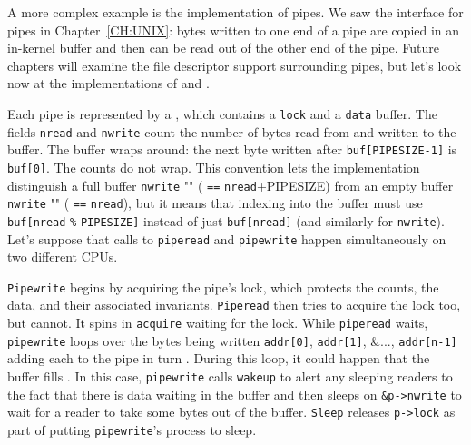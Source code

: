 A more complex example is the implementation of pipes.
We saw the interface for pipes in Chapter~\ref{CH:UNIX}:
bytes written to one end of a pipe are copied
in an in-kernel buffer and then can be read out
of the other end of the pipe.
Future chapters will examine the file descriptor support
surrounding pipes, but let's look now at the
implementations of 
and
.

Each pipe
is represented by a 
,
which contains
a 
\lstinline{lock}
and a 
\lstinline{data}
buffer.
The fields
\lstinline{nread}
and
\lstinline{nwrite}
count the number of bytes read from
and written to the buffer.
The buffer wraps around:
the next byte written after
\lstinline{buf[PIPESIZE-1]}
is 
\lstinline{buf[0]}.
The counts do not wrap.
This convention lets the implementation
distinguish a full buffer 
\lstinline{nwrite} "" (
\lstinline{==}
\lstinline{nread}+PIPESIZE)
from an empty buffer
\lstinline{nwrite} "" (
\lstinline{==}
\lstinline{nread}),
but it means that indexing into the buffer
must use
\lstinline{buf[nread}
\lstinline{%}
\lstinline{PIPESIZE]}
instead of just
\lstinline{buf[nread]} 
(and similarly for
\lstinline{nwrite}).
Let's suppose that calls to
\lstinline{piperead}
and
\lstinline{pipewrite}
happen simultaneously on two different CPUs.

\lstinline{Pipewrite}
begins by acquiring the pipe's lock, which
protects the counts, the data, and their
associated invariants.
\lstinline{Piperead}
then tries to acquire the lock too, but cannot.
It spins in
\lstinline{acquire}
waiting for the lock.
While
\lstinline{piperead}
waits,
\lstinline{pipewrite}
loops over the bytes being written
\lstinline{addr[0]},
\lstinline{addr[1]},
\&...,
\lstinline{addr[n-1]}
adding each to the pipe in turn
.
During this loop, it could happen that
the buffer fills
.
In this case, 
\lstinline{pipewrite}
calls
\lstinline{wakeup}
to alert any sleeping readers to the fact
that there is data waiting in the buffer
and then sleeps on
\lstinline{&p->nwrite}
to wait for a reader to take some bytes
out of the buffer.
\lstinline{Sleep}
releases 
\lstinline{p->lock}
as part of putting
\lstinline{pipewrite}'s
process to sleep.

